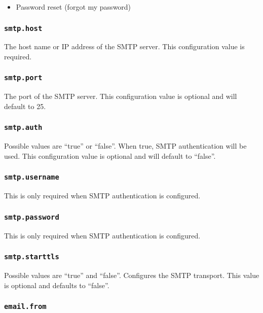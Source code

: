 \begin{itemize}
\item Password reset (forgot my password)
\end{itemize}

\subsubsection{\tt smtp.host}

The host name or IP address of the SMTP server.  This configuration value is required.

\subsubsection{\tt smtp.port}

The port of the SMTP server.  This configuration value is optional and will default to 25.

\subsubsection{\tt smtp.auth}

Possible values are ``true'' or ``false''.  When true, SMTP authentication will be used.  This configuration value is optional and will default to ``false''.

\subsubsection{\tt smtp.username}

This is only required when SMTP authentication is configured.

\subsubsection{\tt smtp.password}

This is only required when SMTP authentication is configured.

\subsubsection{\tt smtp.starttls}

Possible values are ``true'' and ``false''.  Configures the SMTP transport.  This value is optional and defaults to ``false''.

\subsubsection{\tt email.from}

